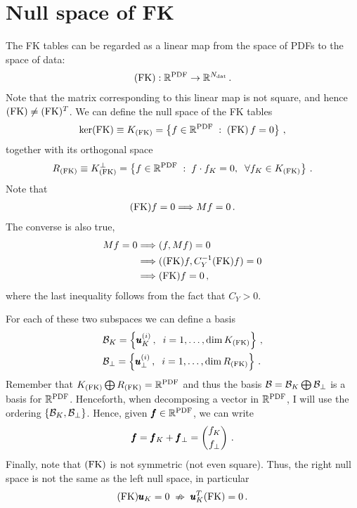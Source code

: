 \section{Null space of FK}
The FK tables can be regarded as a linear map from the space of PDFs to the space of 
data:
\begin{align}
  (\mathrm{FK}) : \mathbb{R}^{\textrm{PDF}} \rightarrow \mathbb{R}^{N_{\mathrm{dat}}} \,.
\end{align}
Note that the matrix corresponding to this linear map is not square, and hence $(\mathrm{FK}) 
\neq (\mathrm{FK})^T$. We can define the null space of the FK tables
\begin{equation}
  \ker (\mathrm{FK}) \equiv K_{(\mathrm{FK})} = 
  \left\{
    f \in \mathbb{R}^{\textrm{PDF}} \; : \; (\mathrm{FK}) \, f = 0
  \right\} \, ,
  \label{eq:ker_FK}
\end{equation}
together with its orthogonal space
\begin{equation}
  R_{(\mathrm{FK})} \equiv K_{(\mathrm{FK})}^{\bot} = 
  \left\{
    f \in \mathbb{R}^{\textrm{PDF}} \; : \; f \cdot f_K = 0,
    \hspace{2mm} \forall f_K \in K_{(\mathrm{FK})}
  \right\}\,.
\end{equation}
Note that 
\begin{align}
  \label{eq:KerFK->KerM}
  (\mathrm{FK}) f = 0 \Longrightarrow M f = 0\, .
\end{align}
The converse is also true, 
\begin{align}
  M f = 0 &\Longrightarrow (f, Mf) = 0 \\
    &\Longrightarrow ((\mathrm{FK}) f, C_Y^{-1} (\mathrm{FK}) f) = 0 \\
    &\Longrightarrow (\mathrm{FK}) f = 0\, ,
\end{align}
where the last inequality follows from the fact that $C_Y>0$.

For each of these two subspaces we can define a basis
\begin{align}
  & \mathcal{B}_{K} = \left\{ \pmb{u}^{(i)}_{K}\,, \hspace{2mm}  i=1,\dots, \dim K_{(\mathrm{FK})} \right\} \,,\\
  & \mathcal{B}_{\bot} = \left\{ \pmb{u}^{(i)}_{\bot}\,, \hspace{2mm}  i=1,\dots, \dim R_{(\mathrm{FK})} \right\} \,.
  \label{eq:FK_basis}
\end{align}
Remember that $K_{(\mathrm{FK})} \bigoplus R_{(\mathrm{FK})} = \mathbb{R}^{\textrm{PDF}}$ and thus the basis $\mathcal{B} = \mathcal{B}_{K}
\bigoplus \mathcal{B}_{\bot}$ is a basis for $\mathbb{R}^{\textrm{PDF}}$. Henceforth, when decomposing a vector in $\mathbb{R}^{\textrm{PDF}}$, I 
will use the ordering $\left\{ \mathcal{B}_{K}, \mathcal{B}_{\bot} \right\}$. Hence, given $\pmb{f}\in \mathbb{R}^{\textrm{PDF}}$, we can
write
\begin{equation}
  \pmb{f} = \pmb{f}_{K} + \pmb{f}_{\bot} 
          = \begin{pmatrix} 
              f_K \\[2pt]
              f_{\bot}
            \end{pmatrix} \,.
\end{equation}
Finally, note that $(\mathrm{FK})$ is not symmetric (not even square). Thus, the right null space is not the same
as the left null space, in particular
\begin{align}
  (\mathrm{FK}) \pmb{u}_K = 0  \; \nRightarrow \; \pmb{u}_K^T (\mathrm{FK}) = 0 \,.
\end{align}


